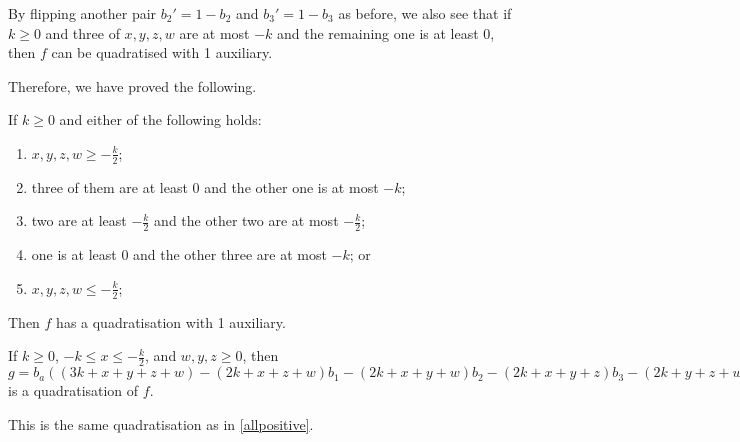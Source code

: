 \documentclass[11pt]{scrartcl}
\begin{document}
By flipping another pair $b_2'=1-b_2$ and $b_3'=1-b_3$ as before, we also see that if $k \ge 0$ and three of $x, y, z, w$ are at most $ -k$ and the remaining one is at least $0$, then $f$ can be quadratised with 1 auxiliary.

Therefore, we have proved the following. 
\begin{proposition}
	\label{oldcases}
	If $k \ge 0$ and either of the following holds:
	\begin{enumerate}
		\item  $x, y, z, w \ge -\frac{k}{2}$;
		\item three of them are at least 0 and the other one is at most $-k$;
		\item two are at least $ -\frac{k}{2}$ and the other two are at most $ -\frac{k}{2}$;
		\item one is at least $0$ and the other three are at most $-k$; or
		\item $x, y, z, w \le -\frac{k}{2}$;
	\end{enumerate}
	Then $f$ has a quadratisation with 1 auxiliary.
\end{proposition}


\begin{lemma}
	\label{1small3large}
	If $k\ge 0$, $-k\le x \le -\frac{k}{2}$, and $w, y, z \ge 0$, then$g = b_a((3k+x+y+z+w) - (2k+x+z+w)b_1 - (2k+x+y+w)b_2 - (2k+x+y+z)b_3 - (2k+y+z+w)b_4) + k(b_1b_2+b_1b_3+b_1 b_4+ b_2b_3+b_2b_4+b_3b_4) + x(b_1b_2+b_1b_3+b_2b_3) + y(b_2b_3+b_2b_4+b_3b_4) + z(b_1b_3+b_1b_4+b_3b_4) + w(b_1b_2+b_1b_4+b_2b_4)$  is a quadratisation of $f$.
\end{lemma}

\begin{remark}
This is the same quadratisation as in \ref{allpositive}.
\end{remark}
\end{document}
